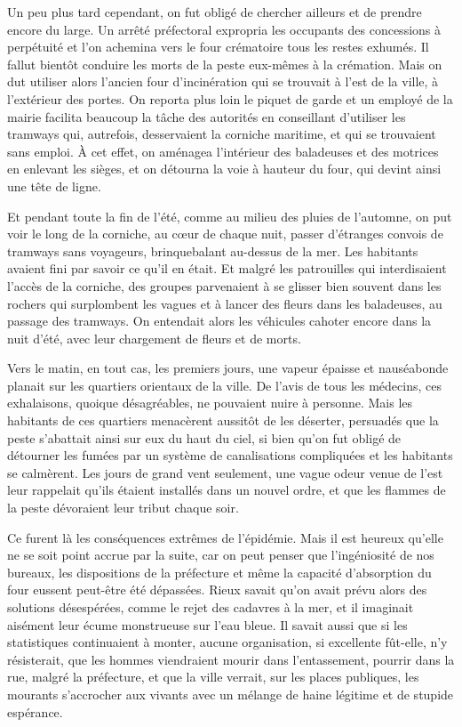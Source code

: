 \documentclass[french,twoside]{book} %
\begin{document}
Un peu plus tard cependant, on fut obligé de chercher ailleurs et de prendre encore du large. Un arrêté préfectoral expropria les occupants des concessions à perpétuité et l’on achemina vers le four crématoire tous les restes exhumés. Il fallut bientôt conduire les morts de la peste eux-mêmes à la crémation. Mais on dut utiliser alors l’ancien four d’incinération qui se trouvait à l’est de la ville, à l’extérieur des portes. On reporta plus loin le piquet de garde et un employé de la mairie facilita beaucoup la tâche des autorités en conseillant d’utiliser les tramways qui, autrefois, desservaient la corniche maritime, et qui se trouvaient sans emploi. À cet effet, on aménagea l’intérieur des baladeuses et des motrices en enlevant les sièges, et on détourna la voie à hauteur du four, qui devint ainsi une tête de ligne.\par
Et pendant toute la fin de l’été, comme au milieu des pluies de l’automne, on put voir le long de la corniche, au cœur de chaque nuit, passer d’étranges convois de tramways sans voyageurs, brinquebalant au-dessus de la mer. Les habitants avaient fini par savoir ce qu’il en était. Et malgré les patrouilles qui interdisaient l’accès de la corniche, des groupes parvenaient à se glisser bien souvent dans les rochers qui surplombent les vagues et à lancer des fleurs dans les baladeuses, au passage des tramways. On entendait alors les véhicules cahoter encore dans la nuit d’été, avec leur chargement de fleurs et de morts.\par
Vers le matin, en tout cas, les premiers jours, une vapeur épaisse et nauséabonde planait sur les quartiers orientaux de la ville. De l’avis de tous les médecins, ces exhalaisons, quoique désagréables, ne pouvaient nuire à personne. Mais les habitants de ces quartiers menacèrent aussitôt de les déserter, persuadés que la peste s’abattait ainsi sur eux du haut du ciel, si bien qu’on fut obligé de détourner les fumées par un système de canalisations compliquées et les habitants se calmèrent. Les jours de grand vent seulement, une vague odeur venue de l’est leur rappelait qu’ils étaient installés dans un nouvel ordre, et que les flammes de la peste dévoraient leur tribut chaque soir.\par
Ce furent là les conséquences extrêmes de l’épidémie. Mais il est heureux qu’elle ne se soit point accrue par la suite, car on peut penser que l’ingéniosité de nos bureaux, les dispositions de la préfecture et même la capacité d’absorption du four eussent peut-être été dépassées. Rieux savait qu’on avait prévu alors des solutions désespérées, comme le rejet des cadavres à la mer, et il imaginait aisément leur écume monstrueuse sur l’eau bleue. Il savait aussi que si les statistiques continuaient à monter, aucune organisation, si excellente fût-elle, n’y résisterait, que les hommes viendraient mourir dans l’entassement, pourrir dans la rue, malgré la préfecture, et que la ville verrait, sur les places publiques, les mourants s’accrocher aux vivants avec un mélange de haine légitime et de stupide espérance.
\end{document}
